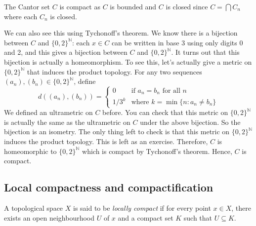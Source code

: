\begin{example}
    The Cantor set $C$ is compact as $C$ is bounded and $C$ is closed since $C=\bigcap C_n$ where each $C_n$ is closed.

    We can also see this using Tychonoff's theorem. We know there is a bijection between $C$ and $\{0,2\}^\mathbb{N}$: each $x\in C$ can be written in base 3 using only digits 0 and 2, and this gives a bijection between $C$ and $\{0,2\}^\mathbb{N}$. It turns out that this bijection is actually a homeomorphism. To see this, let's actually give a metric on $\{0,2\}^\mathbb{N}$ that induces the product topology. For any two sequences $(a_n),(b_n)\in \{0,2\}^\mathbb{N}$, define
    \[d((a_n),(b_n))=\begin{cases}
    0 & \text{if } a_n=b_n \text{ for all } n\\
    1/3^{k} & \text{where } k=\min\{n:a_n\neq b_n\}
    \end{cases}\]
    We defined an ultrametric on $C$ before. You can check that this metric on $\{0,2\}^\mathbb{N}$ is actually the same as the ultrametric on $C$ under the above bijection. So the bijection is an isometry. The only thing left to check is that this metric on $\{0,2\}^\mathbb{N}$ induces the product topology. This is left as an exercise. Therefore, $C$ is homeomorphic to $\{0,2\}^\mathbb{N}$ which is compact by Tychonoff's theorem. Hence, $C$ is compact.
\end{example}

\subsection{Local compactness and compactification}



\begin{definition}
    A topological space \(X\) is said to be \emph{locally compact} if for every point \(x \in X\), there exists an open neighbourhood \(U\) of \(x\) and a compact set \(K\) such that \(U\subseteq K\).
\end{definition}



